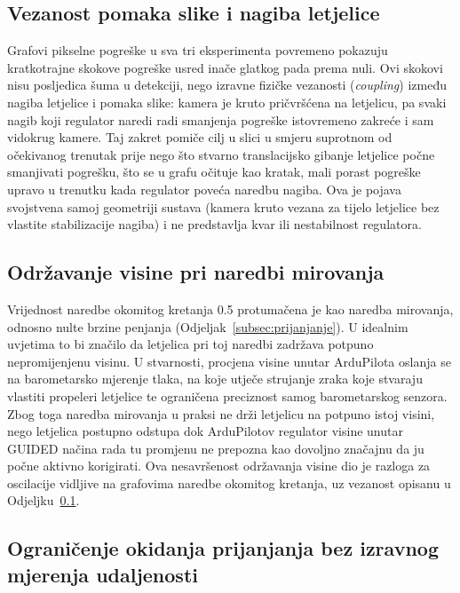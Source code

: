 \subsection{Vezanost pomaka slike i nagiba letjelice}
\label{subsec:rasprava-coupling}

Grafovi pikselne pogreške u sva tri eksperimenta povremeno pokazuju kratkotrajne skokove pogreške usred inače glatkog pada prema nuli. Ovi skokovi nisu posljedica šuma u detekciji, nego izravne fizičke vezanosti (\emph{coupling}) između nagiba letjelice i pomaka slike: kamera je kruto pričvršćena na letjelicu, pa svaki nagib koji regulator naredi radi smanjenja pogreške istovremeno zakreće i sam vidokrug kamere. Taj zakret pomiče cilj u slici u smjeru suprotnom od očekivanog trenutak prije nego što stvarno translacijsko gibanje letjelice počne smanjivati pogrešku, što se u grafu očituje kao kratak, mali porast pogreške upravo u trenutku kada regulator poveća naredbu nagiba. Ova je pojava svojstvena samoj geometriji sustava (kamera kruto vezana za tijelo letjelice bez vlastite stabilizacije nagiba) i ne predstavlja kvar ili nestabilnost regulatora.

\subsection{Održavanje visine pri naredbi mirovanja}
\label{subsec:rasprava-barometar}

Vrijednost naredbe okomitog kretanja 0.5 protumačena je kao naredba mirovanja, odnosno nulte brzine penjanja (Odjeljak~\ref{subsec:prijanjanje}). U idealnim uvjetima to bi značilo da letjelica pri toj naredbi zadržava potpuno nepromijenjenu visinu. U stvarnosti, procjena visine unutar ArduPilota oslanja se na barometarsko mjerenje tlaka, na koje utječe strujanje zraka koje stvaraju vlastiti propeleri letjelice te ograničena preciznost samog barometarskog senzora. Zbog toga naredba mirovanja u praksi ne drži letjelicu na potpuno istoj visini, nego letjelica postupno odstupa dok ArduPilotov regulator visine unutar GUIDED načina rada tu promjenu ne prepozna kao dovoljno značajnu da ju počne aktivno korigirati. Ova nesavršenost održavanja visine dio je razloga za oscilacije vidljive na grafovima naredbe okomitog kretanja, uz vezanost opisanu u Odjeljku~\ref{subsec:rasprava-coupling}.

\subsection{Ograničenje okidanja prijanjanja bez izravnog mjerenja udaljenosti}
\label{subsec:rasprava-okidanje}

